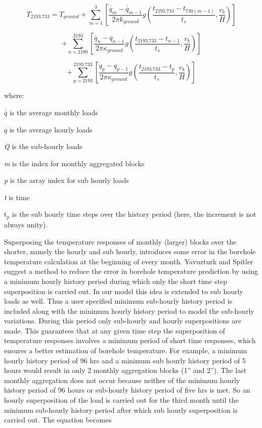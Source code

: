 \begin{equation}
{T_{2193.733}} = {T_{ground}} + \sum\limits_{m = 1}^3 {\left[ {\frac{{{{\overline{\overline q} }_m} - {{\overline{\overline q} }_{m - 1}}}}{{2\pi {k_{ground}}}}g\left( {\frac{{{t_{2193.733}} - {t_{730(m - 1)}}}}{{{t_s}}},\frac{{{r_b}}}{H}} \right)} \right]}
\end{equation}

\begin{equation}
+ \sum\limits_{n = 2190}^{2193} {\left[ {\frac{{{{\overline q }_n} - {{\overline q }_{n - 1}}}}{{2\pi {\kappa_{ground}}}}g\left( {\frac{{{t_{2193.733}} - {t_{n - 1}}}}{{{t_s}}},\frac{{{r_b}}}{H}} \right)} \right]}
\end{equation}

\begin{equation}
+ \sum\limits_{p = 2193}^{2193.733} {\left[ {\frac{{{q_p} - {q_{p - 1}}}}{{2\pi {\kappa_{ground}}}}g\left( {\frac{{{t_{2193.733}} - {t_p}}}{{{t_s}}},\frac{{{r_b}}}{H}} \right)} \right]}
\end{equation}

where:

\(\overline{\overline q}\) is the average monthly loads

\(\overline q\) is the average hourly loads

\emph{Q} is the sub-hourly loads

\emph{m} is the index for monthly aggregated blocks

\emph{p} is the array index for sub hourly loads

\emph{t} is time

t\(_{p}\) is the sub hourly time steps over the history period (here, the increment is not always unity).

Superposing the temperature responses of monthly (larger) blocks over the shorter, namely the hourly and sub hourly, introduces some error in the borehole temperature calculation at the beginning of every month. Yavuzturk and Spitler suggest a method to reduce the error in borehole temperature prediction by using a minimum hourly history period during which only the short time step superposition is carried out. In our model this idea is extended to sub hourly loads as well. Thus a user specified minimum sub-hourly history period is included along with the minimum hourly history period to model the sub-hourly variations. During this period only sub-hourly and hourly superpositions are made. This guarantees that at any given time step the superposition of temperature responses involves a minimum period of short time responses, which ensures a better estimation of borehole temperature. For example, a minimum hourly history period of 96 hrs and a minimum sub hourly history period of 5 hours would result in only 2 monthly aggregation blocks (1'' and 2''). The last monthly aggregation does not occur because neither of the minimum hourly history period of 96 hours or sub-hourly history period of five hrs is met. So an hourly superposition of the load is carried out for the third month until the minimum sub-hourly history period after which sub hourly superposition is carried out. The equation becomes

